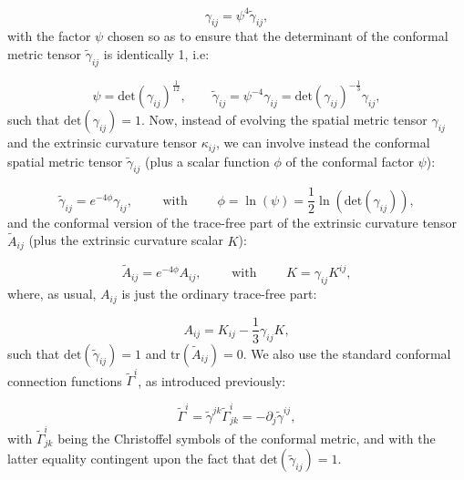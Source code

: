 \documentclass{article}
\begin{document}
\begin{equation}
\gamma_{i j} = \psi^4 \tilde{\gamma}_{i j},
\end{equation}
with the factor ${\psi}$ chosen so as to ensure that the determinant of the conformal metric tensor ${\tilde{\gamma}_{i j}}$ is identically 1, i.e:

\begin{equation}
\psi = \mathrm{det} \left( \gamma_{i j} \right)^{\frac{1}{12}}, \qquad \tilde{\gamma}_{i j} = \psi^{-4} \gamma_{i j} = \mathrm{det} \left( \gamma_{i j} \right)^{- \frac{1}{3}} \gamma_{i j},
\end{equation}
such that ${\mathrm{det} \left( \gamma_{i j} \right) = 1}$. Now, instead of evolving the spatial metric tensor ${\gamma_{i j}}$ and the extrinsic curvature tensor ${\kappa_{i j}}$, we can involve instead the conformal spatial metric tensor ${\tilde{\gamma}_{i j}}$ (plus a scalar function ${\phi}$ of the conformal factor ${\psi}$):

\begin{equation}
\tilde{\gamma}_{i j} = e^{-4 \phi} \gamma_{i j}, \qquad \text{ with } \qquad \phi = \ln \left( \psi \right) = \frac{1}{2} \ln \left( \mathrm{det} \left( \gamma_{i j} \right) \right),
\end{equation}
and the conformal version of the trace-free part of the extrinsic curvature tensor ${\tilde{A}_{i j}}$ (plus the extrinsic curvature scalar $K$):

\begin{equation}
\tilde{A}_{i j} = e^{-4 \phi} A_{i j}, \qquad \text{ with } \qquad K = \gamma_{i j} K^{i j},
\end{equation}
where, as usual, ${A_{i j}}$ is just the ordinary trace-free part:

\begin{equation}
A_{i j} = K_{i j} - \frac{1}{3} \gamma_{i j} K,
\end{equation}
such that ${\mathrm{det} \left( \tilde{\gamma}_{i j} \right) = 1}$ and ${\mathrm{tr} \left( \tilde{A}_{i j} \right) = 0}$. We also use the standard conformal connection functions ${\tilde{\Gamma}^i}$, as introduced previously:

\begin{equation}
\tilde{\Gamma}^i = \tilde{\gamma}^{j k} \tilde{\Gamma}_{j k}^{i} = - \partial_j \tilde{\gamma}^{i j},
\end{equation}
with ${\tilde{\Gamma}^{i}_{j k}}$ being the Christoffel symbols of the conformal metric, and with the latter equality contingent upon the fact that ${\mathrm{det} \left( \tilde{\gamma}_{i j} \right) = 1}$.
\end{document}
